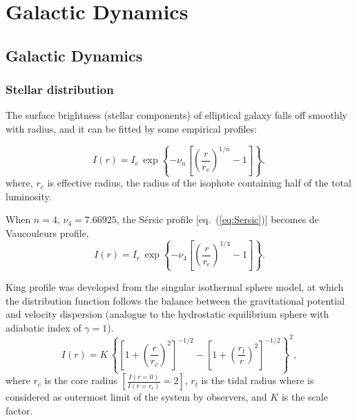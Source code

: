 \chapter{Galactic Dynamics}

\section{Galactic Dynamics}

\bigskip
\subsection{Stellar distribution}\label{subsec:stardist}

The surface brightness (stellar components) of elliptical galaxy falls off smoothly with radius,
and it can be fitted by some empirical profiles:


\begin{equation}\label{eq:Sersic}
    I(r) = I_{e}\,\exp{ \left\{ -\nu_{n} \left[ \left( \frac{r}{r_{e}}\right)^{1/n} - 1 \right] \right\}},
\end{equation}
where, $r_{e}$ is effective radius, the radius of the isophote containing half of the total luminosity.

\medskip
{} 

When $n=4,\,\nu_{4}=7.66925$, the S\'{e}rsic profile [eq.~(\ref{eq:Sersic})] becomes de Vaucouleurs profile,
\begin{equation}
    I(r) = I_{e}\,\exp{ \left\{ -\nu_{4} \left[ \left( \frac{r}{r_{e}}\right)^{1/4} - 1 \right] \right\}}.
\end{equation}


\medskip
{}

King profile was developed from the singular isothermal sphere model, at which the distribution function 
follows the balance between the gravitational potential and velocity dispersion (analogue to the hydrostatic 
equilibrium sphere with adiabatic index of $\gamma=1$).
\begin{equation}
    I(r) = K\,\left\{ \left[ 1 + \left( \frac{r}{r_{c}} \right)^{2} \right]^{-1/2} 
            - \left[ 1+ \left( \frac{r_{t}}{r} \right)^{2} \right]^{-1/2} \right\}^{2},
\end{equation}
where $r_{c}$ is the core radius $\left[ \frac{I(r=0)}{I(r=r_{c})}=2 \right]$, $r_{t}$ is the tidal radius where 
is considered as outermost limit of the system by observers, and $K$ is the scale factor.

